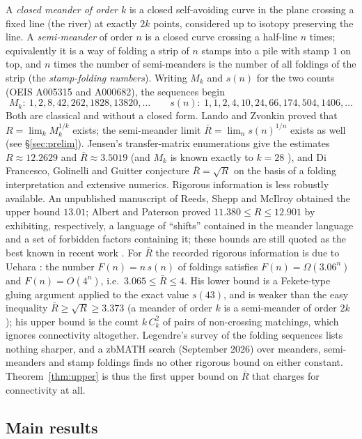 \documentclass[11pt]{amsart}
\theoremstyle{definition}
\newcommand{\Rb}{\bar R}
\begin{document}
A \emph{closed meander of order $k$} is a closed self-avoiding curve in the plane crossing a fixed line (the river) at exactly $2k$ points, considered up to isotopy preserving the line. A \emph{semi-meander} of order $n$ is a closed curve crossing a half-line $n$ times; equivalently \cite{Koehler,Lunnon,Legendre} it is a way of folding a strip of $n$ stamps into a pile with stamp $1$ on top, and $n$ times the number of semi-meanders is the number of all foldings of the strip (the \emph{stamp-folding numbers}). Writing $M_k$ and $s(n)$ for the two counts (OEIS A005315 and A000682), the sequences begin
\[
M_k:\ 1,2,8,42,262,1828,13820,\dots\qquad s(n):\ 1,1,2,4,10,24,66,174,504,1406,\dots
\]
Both are classical and without a closed form. Lando and Zvonkin \cite{LandoZvonkin} proved that $R=\lim_k M_k^{1/k}$ exists; the semi-meander limit $\Rb=\lim_n s(n)^{1/n}$ exists as well (see \S\ref{sec:prelim}). Jensen's transfer-matrix enumerations \cite{Jensen2000,JensenGuttmann} give the estimates $R\approx12.2629$ and $\Rb\approx3.5019$ (and $M_k$ is known exactly to $k=28$ \cite{OEIS}), and Di Francesco, Golinelli and Guitter \cite{DFGG96,DFGGTL} conjecture $\Rb=\sqrt R$ on the basis of a folding interpretation and extensive numerics. Rigorous information is less robustly available. An unpublished manuscript of Reeds, Shepp and McIlroy \cite{ReedsShepp} obtained the upper bound $13.01$; Albert and Paterson \cite{AlbertPaterson} proved $11.380\le R\le12.901$ by exhibiting, respectively, a language of ``shifts'' contained in the meander language and a set of forbidden factors containing it; these bounds are still quoted as the best known in recent work \cite{DGZZ}. For $\Rb$ the recorded rigorous information is due to Uehara \cite[Theorem~2]{Uehara}: the number $F(n)=n\,s(n)$ of foldings satisfies $F(n)=\Omega(3.06^n)$ and $F(n)=O(4^n)$, i.e.\ $3.065\le\Rb\le4$. His lower bound is a Fekete-type gluing argument applied to the exact value $s(43)$, and is weaker than the easy inequality $\Rb\ge\sqrt R\ge3.373$ (a meander of order $k$ is a semi-meander of order $2k$); his upper bound is the count $k\,C_k^2$ of pairs of non-crossing matchings, which ignores connectivity altogether. Legendre's survey of the folding sequences \cite{Legendre} lists nothing sharper, and a zbMATH search (September 2026) over meanders, semi-meanders and stamp foldings finds no other rigorous bound on either constant. Theorem~\ref{thm:upper} is thus the first upper bound on $\Rb$ that charges for connectivity at all.

\subsection*{Main results}
\end{document}
